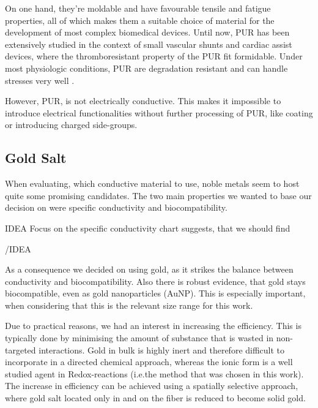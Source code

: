 On one hand, they're moldable and have favourable tensile and fatigue properties, all of which makes them a suitable choice of material for the development of most complex biomedical devices. \cite{Pinchuk}
Until now, PUR has been extensively studied in the context of small vascular shunts and cardiac assist devices, where the thromboresistant property of the PUR fit formidable. Under most physiologic conditions, PUR are degradation resistant and can handle stresses very well \cite{Ulery}.

However, PUR, is not electrically conductive. This makes it impossible to introduce electrical functionalities without further processing of PUR, like coating or introducing charged side-groups. 

\subsection{Gold Salt}
\label{subsec:GoldSalt}

When evaluating, which conductive material to use, noble metals seem to
host quite some promising candidates. The two main properties we wanted to
base our decision on were specific conductivity and biocompatibility.

IDEA
Focus on the specific conductivity chart suggests, that we should find 

/IDEA

As a consequence we decided on using gold, as it strikes the balance between conductivity and 
biocompatibility.  Also there is robust evidence, that gold stays biocompatible, even as gold nanoparticles (AuNP).  This is especially important, when considering that this is the 
relevant size range for this work. \cite{Liu, Shukla}

Due to practical reasons, we had an interest in increasing the efficiency.  This is typically done by minimising the amount of substance that is wasted in non-targeted interactions. Gold in bulk is highly inert and therefore difficult to incorporate in a directed chemical approach, whereas the ionic form is a well studied agent in Redox-reactions (i.e.the method that was chosen in this work). The increase in efficiency can be achieved using a spatially selective approach, where gold salt located only in and on the fiber is reduced to become solid gold.

